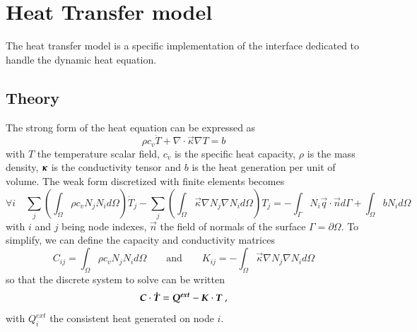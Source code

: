 \chapter{Heat Transfer model}

The heat transfer model is a specific implementation of the  interface
dedicated to handle the dynamic heat equation. 
\section{Theory}
The strong form of the heat equation 
can be expressed as
\begin{equation}
  \rho c_v \dot{T} + \nabla \cdot \vec{\kappa} \nabla T = b
\end{equation}
with $T$ the temperature scalar field,
$c_v$ is the specific heat capacity, 
$\rho$ is the mass density, 
$\boldsymbol{\kappa}$ is the conductivity tensor and $b$ is the heat generation per unit of volume. 
The weak form discretized with finite elements becomes
\begin{equation}
  \forall i \quad 
  \sum_j \left( \int_\Omega \rho c_v N_j N_i  d\Omega \right) \dot{T}_j 
  - \sum_j \left( \int_\Omega \vec{\kappa} \nabla N_j \nabla N_i d\Omega \right) T_j = 
  - \int_{\Gamma}  N_i \vec{q} \cdot \vec{n} d\Gamma + \int_\Omega b N_i d\Omega
\end{equation}
with $i$ and $j$ being node indexes, $\vec{n}$ the field of normals of the surface 
$\Gamma = \partial \Omega$. 
To simplify, we can define the capacity and conductivity matrices
\begin{equation}
  C_{ij} = \int_\Omega \rho c_v N_j N_i  d\Omega \qquad \textrm{and} \qquad   
  K_{ij} = - \int_\Omega \vec{\kappa} \nabla N_j \nabla N_i d\Omega
\end{equation}
so that the discrete system to solve can be written
\begin{equation}
  \boldsymbol{C} \cdot \boldsymbol{\dot{T}} = \boldsymbol{Q^{ext}} -\boldsymbol{K} \cdot \boldsymbol{T}~, 
\end{equation}
with $Q^{ext}_i$ the consistent heat generated on node $i$.
